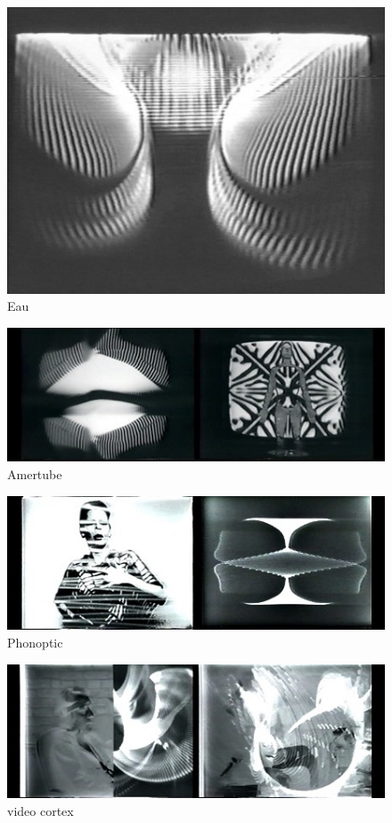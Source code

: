 \documentclass[
  french,
]{book}
\begin{document}
\begin{figure}
\centering
\includegraphics{medias/corpus/boyer/Eau.jpg}
\caption{Eau}
\end{figure}

\begin{figure}
\centering
\includegraphics{medias/corpus/boyer/L-Amertube-2f5ae.jpg}
\caption{Amertube}
\end{figure}

\begin{figure}
\centering
\includegraphics{medias/corpus/boyer/Phonoptic-33bd2.jpg}
\caption{Phonoptic}
\end{figure}

\begin{figure}
\centering
\includegraphics{medias/corpus/boyer/Video-Cortex-b8d37.jpg}
\caption{video cortex}
\end{figure}
\end{document}
